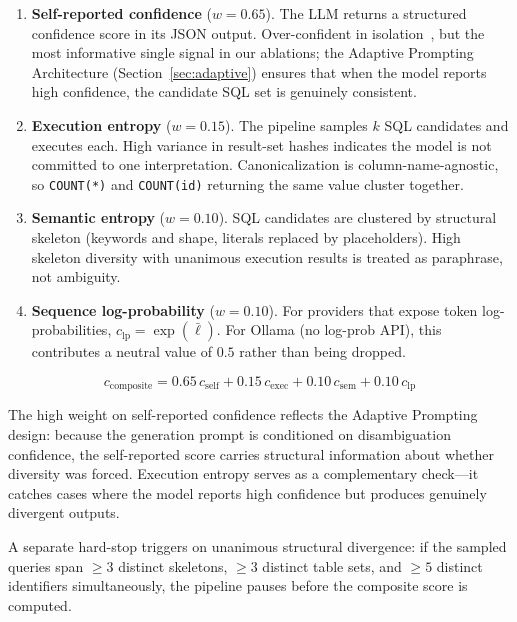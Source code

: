 \documentclass{article}
\begin{document}
\begin{enumerate}
  \item \textbf{Self-reported confidence} ($w{=}0.65$). The LLM returns a
        structured confidence score in its JSON output.  Over-confident in
        isolation~\citep{calibration_llm}, but the most informative single
        signal in our ablations; the Adaptive Prompting Architecture
        (Section~\ref{sec:adaptive}) ensures that when the model reports high
        confidence, the candidate SQL set is genuinely consistent.

  \item \textbf{Execution entropy} ($w{=}0.15$). The pipeline samples $k$
        SQL candidates and executes each.  High variance in result-set hashes
        indicates the model is not committed to one interpretation.
        Canonicalization is column-name-agnostic, so \texttt{COUNT(*)} and
        \texttt{COUNT(id)} returning the same value cluster together.

  \item \textbf{Semantic entropy} ($w{=}0.10$). SQL candidates are clustered
        by structural skeleton (keywords and shape, literals replaced by
        placeholders).  High skeleton diversity with unanimous execution results
        is treated as paraphrase, not ambiguity.

  \item \textbf{Sequence log-probability} ($w{=}0.10$). For providers that
        expose token log-probabilities, $c_{\text{lp}} = \exp(\bar{\ell})$.
        For Ollama (no log-prob API), this contributes a neutral value of
        $0.5$ rather than being dropped.
\end{enumerate}

\begin{equation}
  c_{\text{composite}} =
    0.65\,c_{\text{self}} +
    0.15\,c_{\text{exec}} +
    0.10\,c_{\text{sem}}  +
    0.10\,c_{\text{lp}}
  \label{eq:composite}
\end{equation}

The high weight on self-reported confidence reflects the Adaptive Prompting
design: because the generation prompt is conditioned on disambiguation
confidence, the self-reported score carries structural information about whether
diversity was forced.  Execution entropy serves as a complementary check---it
catches cases where the model reports high confidence but produces genuinely
divergent outputs.

A separate hard-stop triggers on unanimous structural divergence: if the
sampled queries span ${\geq}3$ distinct skeletons, ${\geq}3$ distinct table
sets, and ${\geq}5$ distinct identifiers simultaneously, the pipeline pauses
before the composite score is computed.
\end{document}
